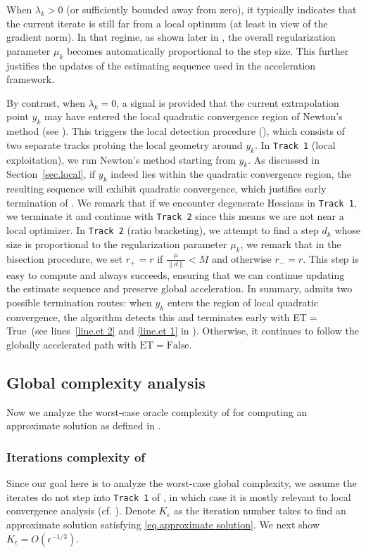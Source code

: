 \documentclass{mcom-l}
\numberwithin{equation}{section}
\begin{document}
When $\lambda_k > 0$ (or sufficiently bounded away from zero), it typically indicates that the current iterate is still far from a local optimum (at least in view of the gradient norm). In that regime, as shown later in , the overall regularization parameter $\mu_k$ becomes automatically proportional to the step size. This further justifies the updates of the estimating sequence used in the acceleration framework.


By contrast, when $\lambda_k = 0$, a signal is provided that the current extrapolation point $y_k$ may have entered the local quadratic convergence region of Newton's method (see ). This triggers the local detection procedure (), which consists of two separate tracks probing the local geometry around $y_k$. In \texttt{Track 1} (local exploitation), we run Newton's method starting from $y_k$. As discussed in Section~\ref{sec.local}, if $y_k$ indeed lies within the quadratic convergence region, the resulting sequence will exhibit quadratic convergence, which justifies early termination of . We remark that if we encounter degenerate Hessians in \texttt{Track 1}, we terminate it and continue with \texttt{Track 2} since this means we are not near a local optimizer. In \texttt{Track 2} (ratio bracketing), we attempt to find a step $d_k$ whose size is proportional to the regularization parameter $\mu_k$, we remark that in the bisection procedure, we set $r_+=r$ if $\frac{\mu}{\|d\|}<M$ and otherwise $r_-=r$. This step is easy to compute and always succeeds, ensuring that we can continue updating the estimate sequence and preserve global acceleration. In summary,  admits two possible termination routes: when $y_k$ enters the region of local quadratic convergence, the algorithm detects this and terminates early with ET$=$True~(see lines~\ref{line.et 2} and \ref{line.et 1} in ). Otherwise, it continues to follow the globally accelerated path with $\mathrm{ET} = \mathrm{False}$.

\subsection{Global complexity analysis}
Now we analyze the worst-case oracle complexity of  for computing an approximate solution as defined in .

\subsubsection{Iterations complexity of }
Since our goal here is to analyze the worst-case global complexity, we assume the iterates do not step into \texttt{Track 1} of , in which case it is mostly relevant to local convergence analysis (cf. ). Denote $K_\epsilon$ as the iteration number  takes to find an approximate solution satisfying \eqref{eq.approximate solution}. We next show $K_\epsilon = O(\epsilon^{-1/3})$.
\end{document}

